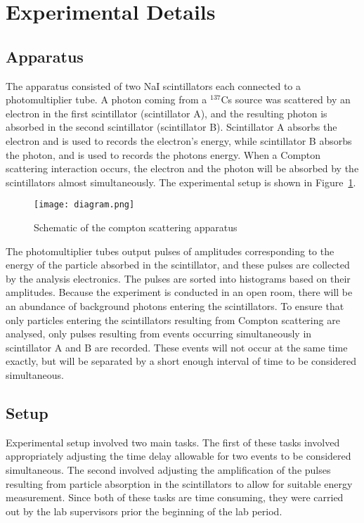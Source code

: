 \documentclass[prb,preprint,groupaddress,showpacs,superbib,floats]{revtex4-1}
\begin{document}
\section{Experimental Details}\label{experiment}
\subsection{Apparatus}
The apparatus consisted of two NaI scintillators each connected to a photomultiplier tube. A photon coming from a $^{137}$Cs source was scattered by an electron in the first scintillator (scintillator A), and the resulting photon is absorbed in the second scintillator (scintillator B). Scintillator A absorbs the electron and is used to records the electron’s energy, while scintillator B absorbs the photon, and is used to records the photons energy. When a Compton scattering interaction occurs, the electron and the photon will be absorbed by the scintillators almost simultaneously. The experimental setup is shown in Figure~\ref{diagram}.


%
\begin{figure}[h]
\centering
\texttt{[image: diagram.png]}
\caption{Schematic of the compton scattering apparatus}
\label{diagram}
\end{figure}

The photomultiplier tubes output pulses of amplitudes corresponding to the energy of the particle absorbed in the scintillator, and these pulses are collected by the analysis electronics. The pulses are sorted into histograms based on their amplitudes. 
Because the experiment is conducted in an open room, there will be an abundance of background photons entering the scintillators. To ensure that only particles entering the scintillators resulting from Compton scattering are analysed, only pulses resulting from events occurring simultaneously in scintillator A and B are recorded. These events will not occur at the same time exactly, but will be separated by a short enough interval of time to be considered simultaneous. 

\subsection{Setup}
Experimental setup involved two main tasks. The first of these tasks involved appropriately adjusting the time delay allowable for two events to be considered simultaneous. The second involved adjusting the amplification of the pulses resulting from particle absorption in the scintillators to allow for suitable energy measurement. Since both of these tasks are time consuming, they were carried out by the lab supervisors prior the beginning of the lab period. 
\end{document}
